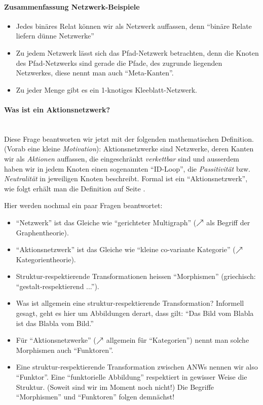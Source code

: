 \paragraph{Zusammenfassung Netzwerk-Beispiele}
\begin{itemize}
    \item Jedes binäres Relat können wir als Netzwerk auffassen, denn ``binäre Relate liefern dünne Netzwerke''
    \item Zu jedem Netzwerk lässt sich das Pfad-Netzwerk betrachten, denn die Knoten des Pfad-Netzwerks sind gerade die Pfade, des zugrunde liegenden Netzwerkes, diese nennt man auch ``Meta-Kanten''.
    \item Zu jeder Menge gibt es ein 1-knotiges Kleeblatt-Netzwerk.
\end{itemize}
\paragraph{Was ist ein Aktionsnetzwerk?}\mylinebreak{}\\
Diese Frage beantworten wir jetzt mit der folgenden mathematischen Definition. (Vorab eine kleine \emph{Motivation}):
Aktionsnetzwerke sind Netzwerke, deren Kanten wir als \emph{Aktionen} auffassen, die eingeschränkt \emph{verkettbar} sind und ausserdem haben wir in jedem Knoten einen sogenannten ``ID-Loop'', die \emph{Passitivität} bzw. \emph{Neutralität} in jeweiligen Knoten beschreibt. Formal ist ein ``Aktionsnetzwerk'', wie folgt erhält man die Definition auf Seite \pageref{def_action_network}.
\begin{overview}[Ausblick]
Hier werden nochmal ein paar Fragen beantwortet:
    \begin{itemize}
        \item ``Netzwerk'' ist das Gleiche wie ``gerichteter Multigraph'' ($\nearrow$ als Begriff der Graphentheorie).
        \item ``Aktionsnetzwerk'' ist das Gleiche wie ``kleine co-variante Kategorie'' ($\nearrow$ Kategorientheorie).
        \item Struktur-respektierende Transformationen heissen ``Morphismen'' (griechisch: ``gestalt-respektierend ...'').
        \item Was ist allgemein eine struktur-respektierende Transformation? Informell gesagt, geht es hier um Abbildungen derart, dass gilt: ``Das Bild vom Blabla ist das Blabla vom Bild.''
        \item Für ``Aktionsnetzwerke'' ($\nearrow$ allgemein für ``Kategorien'') nennt man solche Morphismen auch ``Funktoren''.
        \item Eine struktur-respektierende Transformation zwischen ANWs nennen wir also ``Funktor''. Eine ``funktorielle Abbildung'' respektiert in gewisser Weise die Struktur. (Soweit sind wir im Moment noch nicht!) Die Begriffe ``Morphismen'' und ``Funktoren'' folgen demnächst!
    \end{itemize}
\end{overview}